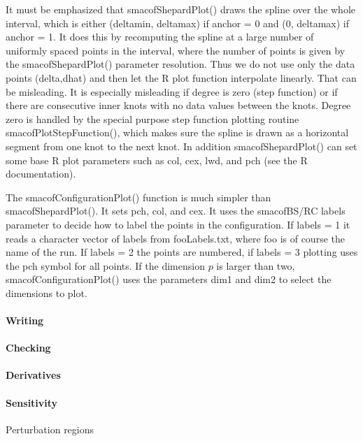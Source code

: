 \documentclass[
  12pt,
]{article}
\begin{document}
It must be emphasized that smacofShepardPlot() draws the spline
over the whole interval, which is either (deltamin, deltamax)
if anchor = 0 and (0, deltamax) if anchor = 1. It does
this by recomputing the spline at a large number of
uniformly spaced points in the interval, where the
number of points is given by the smacofShepardPlot()
parameter resolution. Thus we do not use only the
data points (delta,dhat) and then let the R plot function
interpolate linearly. That can be misleading. It is
especially misleading if degree is zero (step function)
or if there are consecutive inner knots with no data values
between the knots. Degree zero is handled by the special
purpose step function plotting routine smacofPlotStepFunction(),
which makes sure the spline is drawn as a horizontal segment
from one knot to the next knot. In addition smacofShepardPlot()
can set some base R plot parameters such as col, cex, lwd, and pch
(see the R documentation).

The smacofConfigurationPlot() function is much simpler than
smacofShepardPlot(). It sets pch, col, and cex. It uses
the smacofBS/RC labels parameter to decide how to label
the points in the configuration. If labels = 1 it reads
a character vector of labels from fooLabels.txt, where
foo is of course the name of the run. If labels = 2
the points are numbered, if labels = 3 plotting uses
the pch symbol for all points. If the dimension \(p\)
is larger than two, smacofConfigurationPlot() uses
the parameters dim1 and dim2 to select the dimensions
to plot.

\paragraph{Writing}\label{writing}

\paragraph{Checking}\label{checking}

\paragraph{Derivatives}\label{derivatives-1}

\paragraph{Sensitivity}\label{sensitivity}

Perturbation regions
\end{document}
